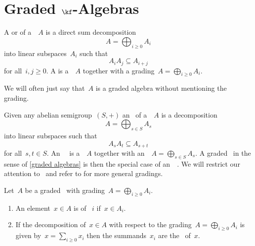 \section{Graded \texorpdfstring{$\kf$}{k}-Algebras}


\begin{definition}
  \label{graded algebras}
  A  or  of a~\algebra{$\kf$}~$A$ is a direct sum decomposition
  \[
    A
    =
    \bigoplus_{i \geq 0} A_i
  \]
  into linear subspaces~$A_i$ such that
  \[
    A_i A_j
    \subseteq
    A_{i+j}
  \]
  for all~$i, j \geq 0$.
  A  is a~\algebra{$\kf$}~$A$ together with a grading~$A = \bigoplus_{i \geq 0} A_i$.
\end{definition}


\begin{remark}
  We will often just say that~$A$ is a graded algebra without mentioning the grading.
\end{remark}


\begin{remark}
  Given any abelian semigroup~$(S, +)$ an~ of a~\algebra{$\kf$}~$A$ is a decomposition
  \[
    A
    =
    \bigoplus_{s \in S} A_s
  \]
  into linear subspaces such that
  \[
    A_s A_t
    \subseteq
    A_{s + t}
  \]
  for all~$s,t \in S$.
  An~{}~\algebra{$\kf$} is a~\algebra{$\kf$}~$A$ together with an~~$A = \bigoplus_{s \in S} A_s$.
  A graded~\algebra{$\kf$} in the sense of \cref{graded algebras} is then the special case of an~{\graded{$\Natural$}}~\algebra{$\kf$}.
  We will restrict our attention to~{\gradings{$\Natural$}} and refer to \cite[II.{\S}11, III.{\S}3]{bourbaki_algebra} for more general gradings.
\end{remark}


\begin{definition}
  Let~$A$ be a graded~{\algebra{$\kf$}} with grading~$A = \bigoplus_{i \geq 0} A_i$.
  \begin{enumerate}
    \item
      An element~$x \in A$ is  of ~$i$ if~$x \in A_i$.
    \item
      If the decomposition of~$x \in A$ with respect to the grading~$A = \bigoplus_{i \geq 0} A_i$ is given by~$x = \sum_{i \geq 0} x_i$ then the summands~$x_i$ are the~ of~$x$.
  \end{enumerate}
\end{definition}


